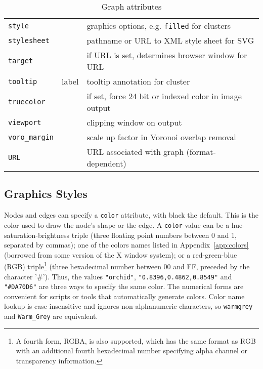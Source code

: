 \documentclass[11pt]{article}
\begin{document}
\begin{table}[p]
\begin{tabular}[t]{|l|l|p{3.5in}|}
{\tt style} & & graphics options, e.g. {\tt filled} for clusters \\
{\tt stylesheet} & & pathname or URL to XML style sheet for SVG \\
{\tt target} & & if URL is set, determines browser window for URL \\
{\tt tooltip} & label & tooltip annotation for cluster \\
{\tt truecolor} &  & if set, force 24 bit or indexed color in image output \\
{\tt viewport} &  & clipping window on output \\
{\tt voro_margin} &  & scale up factor in Voronoi overlap removal \\
{\tt URL} & & URL associated with graph (format-dependent) \\
\hline
\end{tabular}
\caption{Graph attributes}
\label{tab:gattr}
\end{table}

\subsection{Graphics Styles}
\label{sect:style}

Nodes and edges can specify a {\tt color} attribute, with black
the default. This is the color used to draw the node's shape
or the edge. A {\tt color} value can be a hue-saturation-brightness triple
(three floating point numbers between 0 and 1, separated by commas);
one of the colors names listed in Appendix~\ref{app:colors}
(borrowed from some version of the X window system); or
a red-green-blue (RGB) triple\footnote{A fourth form, RGBA, is also supported,
which has the same format as RGB with an additional fourth hexadecimal 
number specifying alpha channel or transparency information.}
(three hexadecimal number between 00 and FF, preceded by the character '\#').
Thus, the values {\tt "orchid"}, {\tt "0.8396,0.4862,0.8549"} and
{\tt "\#DA70D6"} are three ways to specify the same color.
The numerical forms are convenient for scripts or tools that
automatically generate colors.
Color name lookup is case-insensitive and ignores non-alphanumeric
characters, so \verb'warmgrey' and \verb'Warm_Grey' are equivalent.
\end{document}
